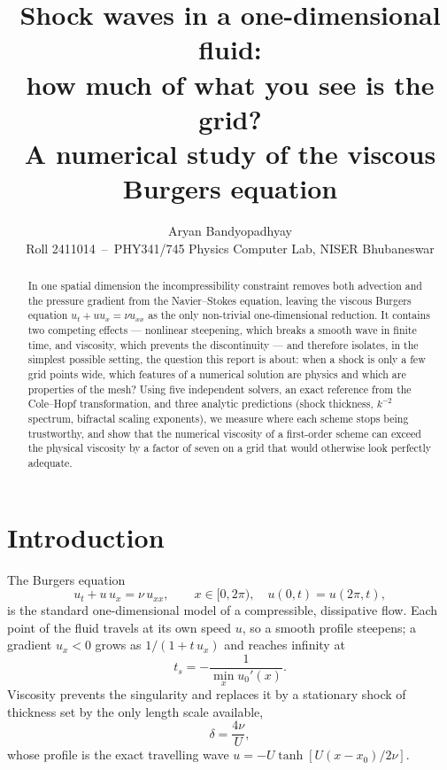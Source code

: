 \documentclass[10pt,a4paper]{article}
\title{\vspace{-1.2cm}\textbf{Shock waves in a one-dimensional fluid:\\
how much of what you see is the grid?}\\[2pt]
\large A numerical study of the viscous Burgers equation}
\author{Aryan Bandyopadhyay \\ \small Roll 2411014 \,--\, PHY341/745 Physics Computer Lab, NISER Bhubaneswar}
\date{}
\newcommand{\deltash}{\delta}
\begin{document}
\maketitle
\vspace{-0.5cm}

\begin{abstract}
\noindent
In one spatial dimension the incompressibility constraint removes both advection
and the pressure gradient from the Navier--Stokes equation, leaving the viscous
Burgers equation $u_t+uu_x=\nu u_{xx}$ as the only non-trivial one-dimensional
reduction. It contains two competing effects --- nonlinear steepening, which
breaks a smooth wave in finite time, and viscosity, which prevents the
discontinuity --- and therefore isolates, in the simplest possible setting, the
question this report is about: when a shock is only a few grid points wide,
which features of a numerical solution are physics and which are properties of
the mesh? Using five independent solvers, an exact reference from the
Cole--Hopf transformation, and three analytic predictions (shock thickness,
$k^{-2}$ spectrum, bifractal scaling exponents), we measure where each scheme
stops being trustworthy, and show that the numerical viscosity of a first-order
scheme can exceed the physical viscosity by a factor of seven on a grid that
would otherwise look perfectly adequate.
\end{abstract}

\section{Introduction}

The Burgers equation
\begin{equation}
  u_t + u\,u_x = \nu\,u_{xx}, \qquad x\in[0,2\pi),\quad u(0,t)=u(2\pi,t),
  \label{eq:burgers}
\end{equation}
is the standard one-dimensional model of a compressible, dissipative flow. Each
point of the fluid travels at its own speed $u$, so a smooth profile steepens;
a gradient $u_x<0$ grows as $1/(1+t\,u_x)$ and reaches infinity at
\begin{equation}
  t_s = -\frac{1}{\min_x u_0'(x)} .
  \label{eq:ts}
\end{equation}
Viscosity prevents the singularity and replaces it by a stationary shock of
thickness set by the only length scale available,
\begin{equation}
  \deltash = \frac{4\nu}{U},
  \label{eq:delta}
\end{equation}
whose profile is the exact travelling wave
$u=-U\tanh\!\left[U(x-x_0)/2\nu\right]$.
\end{document}
